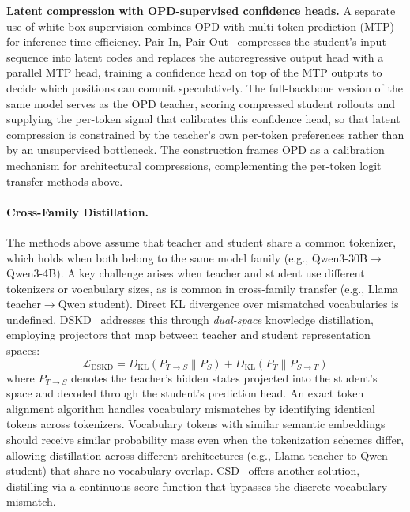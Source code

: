 \documentclass{article} %
\newcommand{\KL}{D_{\mathrm{KL}}}
\begin{document}
\textbf{Latent compression with OPD-supervised confidence heads.} A separate use of white-box supervision combines OPD with multi-token prediction (MTP) for inference-time efficiency. Pair-In, Pair-Out~\citep{2605.27255} compresses the student's input sequence into latent codes and replaces the autoregressive output head with a parallel MTP head, training a confidence head on top of the MTP outputs to decide which positions can commit speculatively. The full-backbone version of the same model serves as the OPD teacher, scoring compressed student rollouts and supplying the per-token signal that calibrates this confidence head, so that latent compression is constrained by the teacher's own per-token preferences rather than by an unsupervised bottleneck. The construction frames OPD as a calibration mechanism for architectural compressions, complementing the per-token logit transfer methods above.

\paragraph{Cross-Family Distillation.}
\label{subsubsec:cross_family}

The methods above assume that teacher and student share a common tokenizer, which holds when both belong to the same model family (e.g., Qwen3-30B$\to$Qwen3-4B). A key challenge arises when teacher and student use different tokenizers or vocabulary sizes, as is common in cross-family transfer (e.g., Llama teacher$\to$Qwen student). Direct KL divergence over mismatched vocabularies is undefined. DSKD~\citep{2504.11426} addresses this through \emph{dual-space} knowledge distillation, employing projectors that map between teacher and student representation spaces:
\begin{equation*}
    \mathcal{L}_{\text{DSKD}} = \KL(P_{T \to S} \parallel P_S) + \KL(P_T \parallel P_{S \to T})
\end{equation*}
where $P_{T \to S}$ denotes the teacher's hidden states projected into the student's space and decoded through the student's prediction head. An exact token alignment algorithm handles vocabulary mismatches by identifying identical tokens across tokenizers. Vocabulary tokens with similar semantic embeddings should receive similar probability mass even when the tokenization schemes differ, allowing distillation across different architectures (e.g., Llama teacher to Qwen student) that share no vocabulary overlap. CSD~\citep{2509.25837} offers another solution, distilling via a continuous score function that bypasses the discrete vocabulary mismatch.
\end{document}
